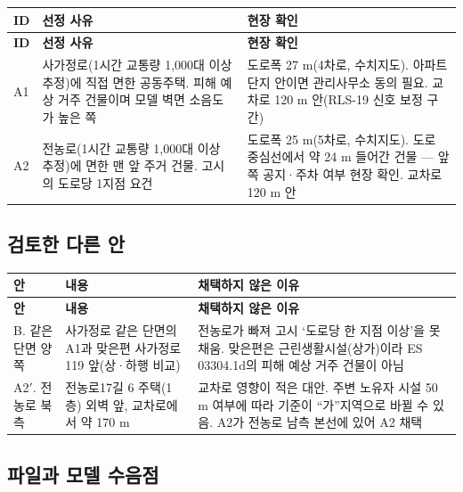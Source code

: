 \documentclass[10.5pt,a4paper]{article}
\newcommand{\hd}[1]{\cellcolor{headfill}\textbf{\sffamily #1}}
\begin{document}
\begin{longtable}{>{\centering\arraybackslash}p{}>{\raggedright\arraybackslash}p{}>{\raggedright\arraybackslash}p{}}
\toprule
\hd{ID} & \hd{선정 사유} & \hd{현장 확인} \\ \midrule
\endfirsthead
\toprule
\hd{ID} & \hd{선정 사유} & \hd{현장 확인} \\ \midrule
\endhead
\bottomrule
\endlastfoot
A1 & 사가정로(1시간 교통량 1,000대 이상 추정)에 직접 면한 공동주택. 피해 예상 거주 건물이며 모델 벽면 소음도가 높은 쪽 & 도로폭 27 m(4차로, 수치지도). 아파트 단지 안이면 관리사무소 동의 필요. 교차로 120 m 안(RLS-19 신호 보정 구간) \\ \midrule
A2 & 전농로(1시간 교통량 1,000대 이상 추정)에 면한 맨 앞 주거 건물. 고시의 도로당 1지점 요건 & 도로폭 25 m(5차로, 수치지도). 도로 중심선에서 약 24 m 들어간 건물 — 앞쪽 공지·주차 여부 현장 확인. 교차로 120 m 안 \\
\end{longtable}
\addtocounter{table}{-1}
\normalsize
{}\subsection{검토한 다른 안}
\footnotesize
\begin{longtable}{>{\raggedright\arraybackslash}p{}>{\raggedright\arraybackslash}p{}>{\raggedright\arraybackslash}p{}}
\toprule
\hd{안} & \hd{내용} & \hd{채택하지 않은 이유} \\ \midrule
\endfirsthead
\toprule
\hd{안} & \hd{내용} & \hd{채택하지 않은 이유} \\ \midrule
\endhead
\bottomrule
\endlastfoot
B. 같은 단면 양쪽 & 사가정로 같은 단면의 A1과 맞은편 사가정로 119 앞(상·하행 비교) & 전농로가 빠져 고시 `도로당 한 지점 이상'을 못 채움. 맞은편은 근린생활시설(상가)이라 ES 03304.1d의 피해 예상 거주 건물이 아님 \\ \midrule
A2$'$. 전농로 북측 & 전농로17길 6 주택(1층) 외벽 앞, 교차로에서 약 170 m & 교차로 영향이 적은 대안. 주변 노유자 시설 50 m 여부에 따라 기준이 ``가''지역으로 바뀔 수 있음. A2가 전농로 남측 본선에 있어 A2 채택 \\
\end{longtable}
\addtocounter{table}{-1}
\normalsize
{}\subsection{파일과 모델 수음점}
\end{document}
